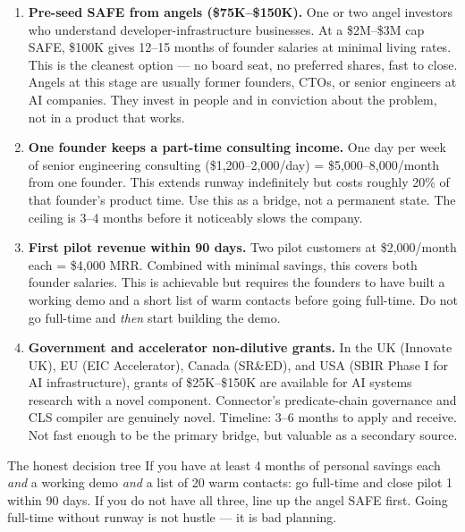 \begin{enumerate}[leftmargin=1.8em, itemsep=4pt]
  \item \textbf{Pre-seed SAFE from angels (\$75K--\$150K).}\;
    One or two angel investors who understand developer-infrastructure
    businesses. At a \$2M--\$3M cap SAFE, \$100K gives 12--15 months of
    founder salaries at minimal living rates. This is the cleanest option
    --- no board seat, no preferred shares, fast to close. Angels at this
    stage are usually former founders, CTOs, or senior engineers at AI
    companies. They invest in people and in conviction about the problem,
    not in a product that works.

  \item \textbf{One founder keeps a part-time consulting income.}\;
    One day per week of senior engineering consulting (\$1,200--2,000/day)
    = \$5,000--8,000/month from one founder. This extends runway indefinitely
    but costs roughly 20\% of that founder's product time. Use this as a
    bridge, not a permanent state. The ceiling is 3--4 months before it
    noticeably slows the company.

  \item \textbf{First pilot revenue within 90 days.}\;
    Two pilot customers at \$2,000/month each = \$4,000 MRR. Combined with
    minimal savings, this covers both founder salaries. This is achievable
    but requires the founders to have built a working demo and a short list
    of warm contacts before going full-time. Do not go full-time and
    \emph{then} start building the demo.

  \item \textbf{Government and accelerator non-dilutive grants.}\;
    In the UK (Innovate UK), EU (EIC Accelerator), Canada (SR\&ED), and
    USA (SBIR Phase I for AI infrastructure), grants of \$25K--\$150K are
    available for AI systems research with a novel component. Connector's
    predicate-chain governance and CLS compiler are genuinely novel.
    Timeline: 3--6 months to apply and receive. Not fast enough to be
    the primary bridge, but valuable as a secondary source.
\end{enumerate}

\begin{insightbox}{The honest decision tree}
If you have at least 4 months of personal savings each \emph{and} a working
demo \emph{and} a list of 20 warm contacts: go full-time and close pilot 1
within 90 days. If you do not have all three, line up the angel SAFE first.
Going full-time without runway is not hustle --- it is bad planning.
\end{insightbox}

